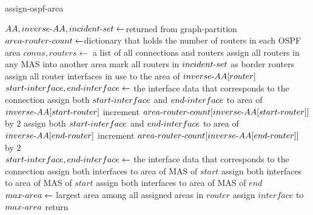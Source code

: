 \documentclass{uiucthesis2021}
\begin{document}
\begin{algorithm}[H]
\caption{assign-ospf-area}\label{alg:cap}
\begin{algorithmic}
    \State $AA, inverse{\text-}AA, incident{\text-}set\gets $returned from graph-partition
    \State $area{\text-}router{\text-}count \gets $dictionary that holds the number of routers in each OSPF area
    \State $conns, routers \gets$ a list of all connections and routers 
    \State assign all routers in any MAS into another area
    \State mark all routers in $incident{\text-}set$ as border routers
            \State assign all router interfaces in use to the area of $inverse{\text-}AA[router]$
        \EndIf
    \EndFor
    \\
            \State $start{\text-}interface, end{\text-}interface \gets$ the interface data that corresponds to the connection
                \State assign both $start{\text-}interface$ and $end{\text-}interface$ to area of $inverse{\text-}AA[start{\text-}router]$
                \State increment $area{\text-}router{\text-}count[inverse{\text-}AA[start{\text-}router]]$ by $2$
            \Else 
                \State assign both $start{\text-}interface$ and $end{\text-}interface$ to area of $inverse{\text-}AA[end{\text-}router]$
                \State increment $area{\text-}router{\text-}count[inverse{\text-}AA[end{\text-}router]]$ by $2$
            \EndIf
        \EndIf
    \EndFor
    \\
        \State $start{\text-}interface, end{\text-}interface \gets$ the interface data that corresponds to the connection
            \State assign both interfaces to area of MAS of $start$
            \State assign both interfaces to area of MAS of $start$
            \State assign both interfaces to area of MAS of $end$
        \EndIf
    \EndFor
    \\
        \State $max{\text -}area \gets$ largest area among all assigned areas in $router$
               assign $interface$ to $max{\text -}area$
            \EndIf
        \EndFor
    \EndFor
    \State return
\end{algorithmic}
\end{algorithm} 
\end{document}
